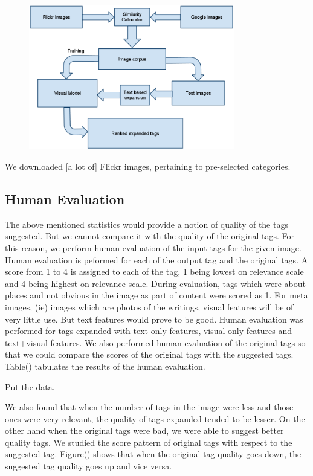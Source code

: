\documentclass[12pt]{article}
\begin{document}
\begin{figure}[h]
\includegraphics[width=0.8\textwidth]{model.png}
\end{figure}

We downloaded [a lot of] Flickr images, pertaining to pre-selected categories.

\subsection{Human Evaluation}
The above mentioned statistics would provide a notion of quality of the tags suggested. But
we cannot compare it with the quality of the original tags. For this reason, we perform human
evaluation of the input tags for the given image. Human evaluation is peformed for each of the
output tag and the original tags. A score from 1 to 4 is assigned to each of the tag, 1 being
lowest on relevance scale and 4 being highest on relevance scale. During evaluation, tags which
were about places and not obvious in the image as part of content were scored as 1. For meta images,
(ie) images which are photos of the writings, visual features will be of very little use. But
text features would prove to be good. Human evaluation was performed for tags expanded with
text only features, visual only features and text+visual features. We also performed human
evaluation of the original tags so that we could compare the scores of the original tags with
the suggested tags. Table() tabulates the results of the human evaluation.

Put the data.

We also found that when the number of tags in the image were less and those ones were very relevant,
the quality of tags expanded tended to be lesser. On the other hand when the original tags were bad,
we were able to suggest better quality tags. We studied the score pattern of original tags with respect
to the suggested tag. Figure() shows that when the original tag quality goes down, the suggested tag
quality goes up and vice versa.
\end{document}
